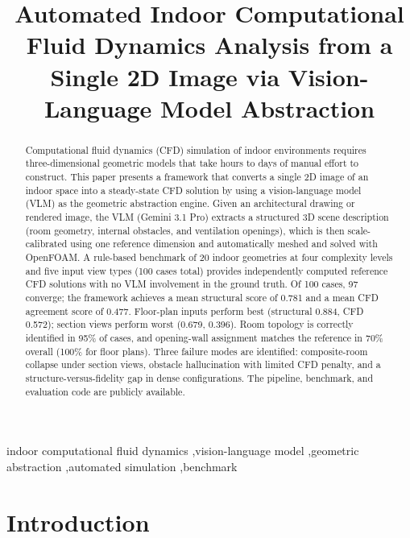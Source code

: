 \documentclass[preprint,12pt,number]{elsarticle}
\begin{document}
\begin{frontmatter}

\title{Automated Indoor Computational Fluid Dynamics Analysis from a Single 2D Image via Vision-Language Model Abstraction}


\begin{abstract}
Computational fluid dynamics (CFD) simulation of indoor environments requires three-dimensional geometric models that take hours to days of manual effort to construct. This paper presents a framework that converts a single 2D image of an indoor space into a steady-state CFD solution by using a vision-language model (VLM) as the geometric abstraction engine. Given an architectural drawing or rendered image, the VLM (Gemini 3.1 Pro) extracts a structured 3D scene description (room geometry, internal obstacles, and ventilation openings), which is then scale-calibrated using one reference dimension and automatically meshed and solved with OpenFOAM. A rule-based benchmark of 20 indoor geometries at four complexity levels and five input view types (100 cases total) provides independently computed reference CFD solutions with no VLM involvement in the ground truth. Of 100 cases, 97 converge; the framework achieves a mean structural score of 0.781 and a mean CFD agreement score of 0.477. Floor-plan inputs perform best (structural 0.884, CFD 0.572); section views perform worst (0.679, 0.396). Room topology is correctly identified in 95\% of cases, and opening-wall assignment matches the reference in 70\% overall (100\% for floor plans). Three failure modes are identified: composite-room collapse under section views, obstacle hallucination with limited CFD penalty, and a structure-versus-fidelity gap in dense configurations. The pipeline, benchmark, and evaluation code are publicly available.
\end{abstract}

\begin{keyword}
indoor computational fluid dynamics \sep vision-language model \sep geometric abstraction \sep automated simulation \sep benchmark
\end{keyword}

\end{frontmatter}

\section{Introduction}
\label{sec:introduction}
\end{document}
